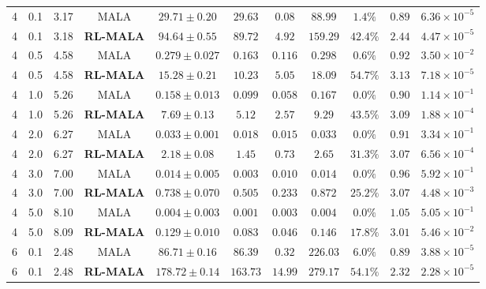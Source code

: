 \documentclass[10pt,a4paper]{article}
\begin{document}
\begin{table}[H]
\begin{adjustbox}{max width=\textwidth}
\begin{tabular}{lcccccccccc}
4 & 0.1 & 3.17 & MALA & $29.71 \pm 0.20$ & $29.63$ & $0.08$ & $88.99$ & $1.4\%$ & $0.89$ & $6.36 \times 10^{-5}$ \\
4 & 0.1 & 3.18 & \textbf{RL-MALA} & \textbf{$94.64 \pm 0.55$} & \textbf{$89.72$} & \textbf{$4.92$} & \textbf{$159.29$} & \textbf{$42.4\%$} & \textbf{$2.44$} & \textbf{$4.47 \times 10^{-5}$} \\
4 & 0.5 & 4.58 & MALA & $0.279 \pm 0.027$ & $0.163$ & $0.116$ & $0.298$ & $0.6\%$ & $0.92$ & $3.50 \times 10^{-2}$ \\
4 & 0.5 & 4.58 & \textbf{RL-MALA} & \textbf{$15.28 \pm 0.21$} & \textbf{$10.23$} & \textbf{$5.05$} & \textbf{$18.09$} & \textbf{$54.7\%$} & \textbf{$3.13$} & \textbf{$7.18 \times 10^{-5}$} \\
4 & 1.0 & 5.26 & MALA & $0.158 \pm 0.013$ & $0.099$ & $0.058$ & $0.167$ & $0.0\%$ & $0.90$ & $1.14 \times 10^{-1}$ \\
4 & 1.0 & 5.26 & \textbf{RL-MALA} & \textbf{$7.69 \pm 0.13$} & \textbf{$5.12$} & \textbf{$2.57$} & \textbf{$9.29$} & \textbf{$43.5\%$} & \textbf{$3.09$} & \textbf{$1.88 \times 10^{-4}$} \\
4 & 2.0 & 6.27 & MALA & $0.033 \pm 0.001$ & $0.018$ & $0.015$ & $0.033$ & $0.0\%$ & $0.91$ & $3.34 \times 10^{-1}$ \\
4 & 2.0 & 6.27 & \textbf{RL-MALA} & \textbf{$2.18 \pm 0.08$} & \textbf{$1.45$} & \textbf{$0.73$} & \textbf{$2.65$} & \textbf{$31.3\%$} & \textbf{$3.07$} & \textbf{$6.56 \times 10^{-4}$} \\
4 & 3.0 & 7.00 & MALA & $0.014 \pm 0.005$ & $0.003$ & $0.010$ & $0.014$ & $0.0\%$ & $0.96$ & $5.92 \times 10^{-1}$ \\
4 & 3.0 & 7.00 & \textbf{RL-MALA} & \textbf{$0.738 \pm 0.070$} & \textbf{$0.505$} & \textbf{$0.233$} & \textbf{$0.872$} & \textbf{$25.2\%$} & \textbf{$3.07$} & \textbf{$4.48 \times 10^{-3}$} \\
4 & 5.0 & 8.10 & MALA & $0.004 \pm 0.003$ & $0.001$ & $0.003$ & $0.004$ & $0.0\%$ & $1.05$ & $5.05 \times 10^{-1}$ \\
4 & 5.0 & 8.09 & \textbf{RL-MALA} & \textbf{$0.129 \pm 0.010$} & \textbf{$0.083$} & \textbf{$0.046$} & \textbf{$0.146$} & \textbf{$17.8\%$} & \textbf{$3.01$} & \textbf{$5.46 \times 10^{-2}$} \\
6 & 0.1 & 2.48 & MALA & $86.71 \pm 0.16$ & $86.39$ & $0.32$ & $226.03$ & $6.0\%$ & $0.89$ & $3.88 \times 10^{-5}$ \\
6 & 0.1 & 2.48 & \textbf{RL-MALA} & \textbf{$178.72 \pm 0.14$} & \textbf{$163.73$} & \textbf{$14.99$} & \textbf{$279.17$} & \textbf{$54.1\%$} & \textbf{$2.32$} & \textbf{$2.28 \times 10^{-5}$} \\

\end{tabular}
\end{adjustbox}
\end{table}
\end{document}
